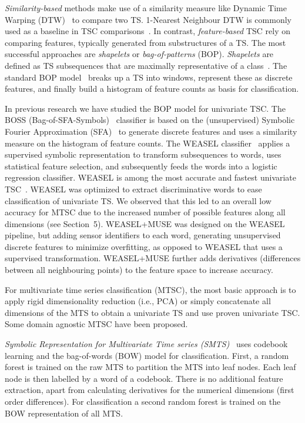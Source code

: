 \documentclass[sigconf]{acmart}
\begin{document}
\emph{Similarity-based} methods make use of a similarity measure like Dynamic Time Warping (DTW)~\cite{rakthanmanon2012searching} to compare two TS. 1-Nearest Neighbour DTW is commonly used as a baseline in TSC comparisons~\cite{bagnall2016great}. In contrast, \emph{feature-based} TSC rely on comparing features, typically generated from substructures of a TS. The most successful approaches are \emph{shapelets} or \emph{bag-of-patterns} (BOP). \emph{Shapelets} are defined as TS subsequences that are maximally representative of a class~\cite{YeK09}. The standard BOP model~\cite{0001KL12} breaks up a TS into windows, represent these as discrete features, and finally build a histogram of feature counts as basis for classification. 

In previous research we have studied the BOP model for univariate TSC. The BOSS (Bag-of-SFA-Symbols)~\cite{schafer2014boss} classifier is based on the (unsupervised) Symbolic Fourier Approximation (SFA)~\cite{SchaferH12} to generate discrete features and uses a similarity measure on the histogram of feature counts. The WEASEL classifier~\cite{schaefer2017weasel} applies a supervised symbolic representation to transform subsequences to words, uses statistical feature selection, and subsequently feeds the words into a logistic regression classifier. WEASEL is among the most accurate and fastest univariate TSC~\cite{schaefer2017weasel}. WEASEL was optimized to extract discriminative words to ease classification of univariate TS. We observed that this led to an overall low accuracy for MTSC due to the increased number of possible features along all dimensions (see Section~5). WEASEL+MUSE was designed on the WEASEL pipeline, but adding sensor identifiers to each word, generating unsupervised discrete features to minimize overfitting, as opposed to WEASEL that uses a supervised transformation. WEASEL+MUSE further adds derivatives (differences between all neighbouring points) to the feature space to increase accuracy.
 
For multivariate time series classification (MTSC), the most basic approach is to apply rigid dimensionality reduction (i.e., PCA) or simply concatenate all dimensions of the MTS to obtain a univariate TS and use proven univariate TSC. Some domain agnostic MTSC have been proposed. 

\emph{Symbolic Representation for Multivariate Time series (SMTS)}~\cite{baydogan2015learning} uses codebook learning and the bag-of-words (BOW) model for classification. First, a random forest is trained on the raw MTS to partition the MTS into leaf nodes. Each leaf node is then labelled by a word of a codebook. There is no additional feature extraction, apart from calculating  derivatives for the numerical dimensions (first order differences). For classification a second random forest is trained on the BOW representation of all MTS. 
\end{document}
